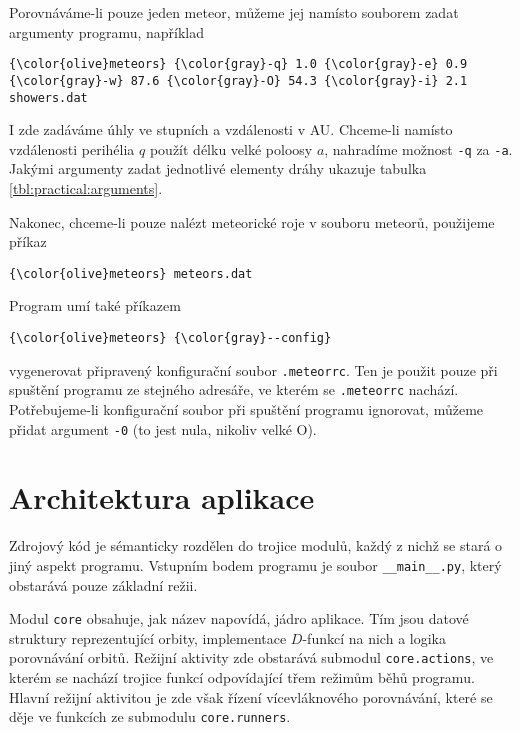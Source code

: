 Porovnáváme-li pouze jeden meteor, můžeme jej namísto souborem zadat argumenty programu, například
\begin{Verbatim}[commandchars=\\\{\},gobble=4,formatcom=\small]
    {\color{olive}meteors} {\color{gray}-q} 1.0 {\color{gray}-e} 0.9 {\color{gray}-w} 87.6 {\color{gray}-O} 54.3 {\color{gray}-i} 2.1 showers.dat
\end{Verbatim}
I zde zadáváme úhly ve stupních a vzdálenosti v AU. Chceme-li namísto vzdálenosti perihélia $q$ použít délku velké poloosy $a$, nahradíme možnost \texttt{-q} za \texttt{-a}. Jakými argumenty zadat jednotlivé elementy dráhy ukazuje tabulka \ref{tbl:practical:arguments}.

Nakonec, chceme-li pouze nalézt meteorické roje v souboru meteorů, použijeme příkaz
\begin{Verbatim}[commandchars=\\\{\},gobble=4,formatcom=\small]
    {\color{olive}meteors} meteors.dat
\end{Verbatim}

\medskip

Program umí také příkazem
\begin{Verbatim}[commandchars=\\\{\},gobble=4,formatcom=\small]
    {\color{olive}meteors} {\color{gray}--config}
\end{Verbatim}
vygenerovat připravený konfigurační soubor \texttt{.meteorrc}. Ten je použit pouze při spuštění programu ze stejného adresáře, ve kterém se \texttt{.meteorrc} nachází. Potřebujeme-li konfigurační soubor při spuštění programu ignorovat, můžeme přidat argument \texttt{-0} (to jest nula, nikoliv velké O).

\section{Architektura aplikace}%
Zdrojový kód je sémanticky rozdělen do trojice modulů, každý z nichž se stará o jiný aspekt programu. Vstupním bodem programu je soubor \texttt{\_\_main\_\_.py}, který obstarává pouze základní režii.

\smallskip

Modul \texttt{core} obsahuje, jak název napovídá, jádro aplikace. Tím jsou datové struktury reprezentující orbity, implementace $D$-funkcí na nich a logika porovnávání orbitů. Režijní aktivity zde obstarává submodul \texttt{core.actions}, ve kterém se nachází trojice funkcí odpovídající třem režimům běhů programu. Hlavní režijní aktivitou je zde však řízení vícevláknového porovnávání, které se děje ve funkcích ze submodulu \texttt{core.runners}.

